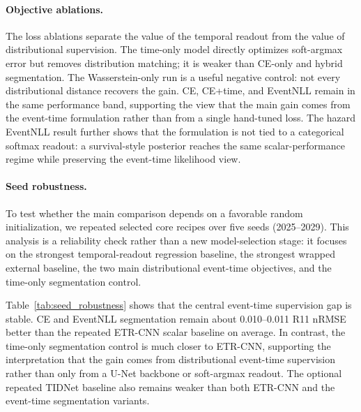 \documentclass[12pt]{article}
\begin{document}
\paragraph{Objective ablations.}
The loss ablations separate the value of the temporal readout from the value of distributional supervision. The time-only model directly optimizes soft-argmax error but removes distribution matching; it is weaker than CE-only and hybrid segmentation. The Wasserstein-only run is a useful negative control: not every distributional distance recovers the gain. CE, CE+time, and EventNLL remain in the same performance band, supporting the view that the main gain comes from the event-time formulation rather than from a single hand-tuned loss. The hazard EventNLL result further shows that the formulation is not tied to a categorical softmax readout: a survival-style posterior reaches the same scalar-performance regime while preserving the event-time likelihood view.

\paragraph{Seed robustness.}
To test whether the main comparison depends on a favorable random initialization, we repeated selected core recipes over five seeds (2025--2029). This analysis is a reliability check rather than a new model-selection stage: it focuses on the strongest temporal-readout regression baseline, the strongest wrapped external baseline, the two main distributional event-time objectives, and the time-only segmentation control.

Table~\ref{tab:seed_robustness} shows that the central event-time supervision gap is stable. CE and EventNLL segmentation remain about 0.010--0.011 R11 nRMSE better than the repeated ETR-CNN scalar baseline on average. In contrast, the time-only segmentation control is much closer to ETR-CNN, supporting the interpretation that the gain comes from distributional event-time supervision rather than only from a U-Net backbone or soft-argmax readout. The optional repeated TIDNet baseline also remains weaker than both ETR-CNN and the event-time segmentation variants.
\end{document}
